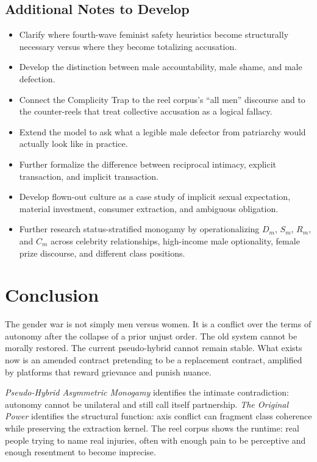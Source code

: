 \documentclass[12pt]{article}
\newcommand{\OP}{\textit{The Original Power}}
\newcommand{\PHAM}{\textit{Pseudo-Hybrid Asymmetric Monogamy}}
\begin{document}
\subsection{Additional Notes to Develop}

\begin{itemize}
  \item Clarify where fourth-wave feminist safety heuristics become structurally necessary versus where they become totalizing accusation.
  \item Develop the distinction between male accountability, male shame, and male defection.
  \item Connect the Complicity Trap to the reel corpus's ``all men'' discourse and to the counter-reels that treat collective accusation as a logical fallacy.
  \item Extend the model to ask what a legible male defector from patriarchy would actually look like in practice.
  \item Further formalize the difference between reciprocal intimacy, explicit transaction, and implicit transaction.
  \item Develop flown-out culture as a case study of implicit sexual expectation, material investment, consumer extraction, and ambiguous obligation.
  \item Further research status-stratified monogamy by operationalizing $D_m$, $S_m$, $R_m$, and $C_m$ across celebrity relationships, high-income male optionality, female prize discourse, and different class positions.
\end{itemize}

\section{Conclusion}

The gender war is not simply men versus women. It is a conflict over the terms of autonomy after the collapse of a prior unjust order. The old system cannot be morally restored. The current pseudo-hybrid cannot remain stable. What exists now is an amended contract pretending to be a replacement contract, amplified by platforms that reward grievance and punish nuance.

\PHAM{} identifies the intimate contradiction: autonomy cannot be unilateral and still call itself partnership. \OP{} identifies the structural function: axis conflict can fragment class coherence while preserving the extraction kernel. The reel corpus shows the runtime: real people trying to name real injuries, often with enough pain to be perceptive and enough resentment to become imprecise.
\end{document}
